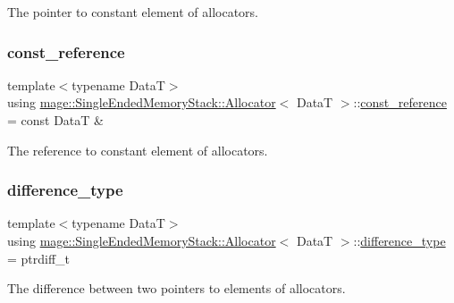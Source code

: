 The pointer to constant element of allocators. \hypertarget{structmage_1_1_single_ended_memory_stack_1_1_allocator_afe1303b90c8f68366f5c88e9a77d12c0}{}\label{structmage_1_1_single_ended_memory_stack_1_1_allocator_afe1303b90c8f68366f5c88e9a77d12c0} 
\subsubsection{\texorpdfstring{const\+\_\+reference}{const\_reference}}
{\footnotesize\ttfamily template$<$typename DataT$>$ \\
using \hyperlink{structmage_1_1_single_ended_memory_stack_1_1_allocator}{mage\+::\+Single\+Ended\+Memory\+Stack\+::\+Allocator}$<$ DataT $>$\+::\hyperlink{structmage_1_1_single_ended_memory_stack_1_1_allocator_afe1303b90c8f68366f5c88e9a77d12c0}{const\+\_\+reference} =  const DataT \&}

The reference to constant element of allocators. \hypertarget{structmage_1_1_single_ended_memory_stack_1_1_allocator_aebd7e5c612fbd49aea979bb115911359}{}\label{structmage_1_1_single_ended_memory_stack_1_1_allocator_aebd7e5c612fbd49aea979bb115911359} 
\subsubsection{\texorpdfstring{difference\+\_\+type}{difference\_type}}
{\footnotesize\ttfamily template$<$typename DataT$>$ \\
using \hyperlink{structmage_1_1_single_ended_memory_stack_1_1_allocator}{mage\+::\+Single\+Ended\+Memory\+Stack\+::\+Allocator}$<$ DataT $>$\+::\hyperlink{structmage_1_1_single_ended_memory_stack_1_1_allocator_aebd7e5c612fbd49aea979bb115911359}{difference\+\_\+type} =  ptrdiff\+\_\+t}

The difference between two pointers to elements of allocators. \hypertarget{structmage_1_1_single_ended_memory_stack_1_1_allocator_a2bc2a84329210a698f0e0bf76da88af3}{}\label{structmage_1_1_single_ended_memory_stack_1_1_allocator_a2bc2a84329210a698f0e0bf76da88af3} 
